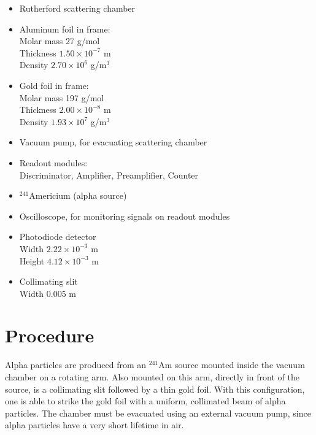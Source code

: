 \documentclass[a4paper]{article}
\begin{document}
\begin{itemize}
\item Rutherford scattering chamber 
\item Aluminum foil in frame:  \\
      Molar mass 27 g/mol \\
      Thickness $1.50 \times 10^{-7}$ m \\
      Density $2.70 \times 10^6$ g/m$^3$ 
\item Gold foil in frame: \\
      Molar mass 197 g/mol \\
      Thickness $2.00 \times 10^{-8}$ m \\
      Density $1.93 \times 10^7$ g/m$^3$ 
\item Vacuum pump, for evacuating scattering chamber
\item Readout modules: \\
      Discriminator, Amplifier, Preamplifier, Counter
\item $ ^{241}$Americium (alpha source)
\item Oscilloscope, for monitoring signals on readout modules
\item Photodiode detector \\
	  Width $2.22 \times 10^{-3}$ m \\
	  Height $4.12 \times 10^{-3}$ m 
\item Collimating slit \\
      Width 0.005 m 
\end{itemize}

\begin{figure}[H]
\centering
\label{name}
\end{figure}

\section{Procedure}


\qq Alpha particles are produced from an $^{241}$Am source mounted inside the
vacuum chamber on a rotating arm. Also mounted on this arm, directly in front of
the source, is a collimating slit followed by a thin gold foil. With this
configuration, one is able to strike the gold foil with a uniform, collimated
beam of alpha particles. The chamber must be evacuated using an external vacuum
pump, since alpha particles have a very short lifetime in air.
\end{document}
